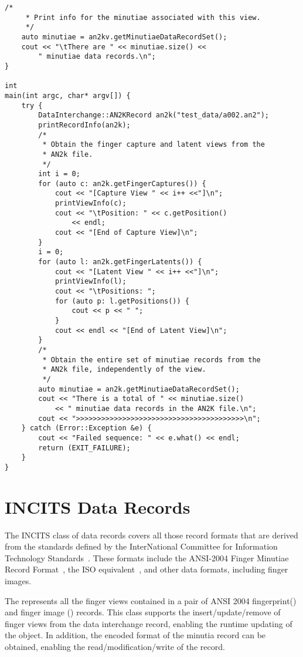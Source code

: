 \begin{lstlisting}[caption={ANSI/NIST Data Interchange}, label=lst:an2kdiuse]
	/*
	 * Print info for the minutiae associated with this view.
	 */
	auto minutiae = an2kv.getMinutiaeDataRecordSet();
	cout << "\tThere are " << minutiae.size() << 
	    " minutiae data records.\n";
}

int
main(int argc, char* argv[]) {
	try {
		DataInterchange::AN2KRecord an2k("test_data/a002.an2");
		printRecordInfo(an2k);
		/*
		 * Obtain the finger capture and latent views from the
		 * AN2k file.
		 */
		int i = 0;
		for (auto c: an2k.getFingerCaptures()) {
			cout << "[Capture View " << i++ <<"]\n";
			printViewInfo(c);
			cout << "\tPosition: " << c.getPosition()
			    << endl;
			cout << "[End of Capture View]\n";
		}
		i = 0;
		for (auto l: an2k.getFingerLatents()) {
			cout << "[Latent View " << i++ <<"]\n";
			printViewInfo(l);
			cout << "\tPositions: ";
			for (auto p: l.getPositions()) {
				cout << p << " ";
			}
			cout << endl << "[End of Latent View]\n";
		}
		/*
		 * Obtain the entire set of minutiae records from the
		 * AN2k file, independently of the view.
		 */
		auto minutiae = an2k.getMinutiaeDataRecordSet();
		cout << "There is a total of " << minutiae.size()
		    << " minutiae data records in the AN2K file.\n";
		cout << ">>>>>>>>>>>>>>>>>>>>>>>>>>>>>>>>>>>>>>>>\n";
	} catch (Error::Exception &e) {
		cout << "Failed sequence: " << e.what() << endl;
		return (EXIT_FAILURE);
	}
}
\end{lstlisting}

\section{INCITS Data Records}
\label{sec-incitsdatarecords}

The INCITS class of data records covers all those record formats that are
derived from the standards defined by the InterNational Committee for
Information Technology Standards~\cite{org:incits}. These formats include the
ANSI-2004 Finger Minutiae Record Format~\cite{std:ansi378-2004}, the ISO
equivalent~\cite{std:iso19794-2}, and other data formats, including finger
images.

The  represents all the finger views
contained in a pair of ANSI 2004 fingerprint(\cite{std:ansi378-2004}) and
finger image (\cite{std:ansi381-2004}) records. This class supports the
insert/update/remove of finger views from the data interchange record,
enabling the runtime updating of the object. In addition, the encoded format
of the minutia record can be obtained, enabling the read/modification/write
of the record.

